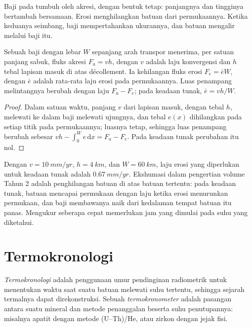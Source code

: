 Baji pada  tumbuh oleh akresi, dengan bentuk tetap: panjangnya
dan tingginya bertambah bersamaan. Erosi menghilangkan batuan dari permukaannya. Ketika
keduanya seimbang, baji mempertahankan ukurannya, dan batuan mengalir melalui baji itu.

\begin{proposition}\label{prop:b3:orogenic-wedges:flux}
Sebuah baji dengan lebar $W$ sepanjang arah transpor menerima, per satuan panjang
sabuk, fluks akresi $F_a = v h$, dengan $v$ adalah
laju konvergensi dan $h$ tebal lapisan masuk di atas décollement. Ia
kehilangan fluks erosi $F_e = \bar e W$, dengan $\bar e$ adalah rata-rata
laju erosi pada permukaannya. Luas penampang melintangnya berubah dengan laju $F_a -
F_e$; pada keadaan tunak, $\bar e = vh/W$.
\end{proposition}

\begin{proof}
Dalam satuan waktu, panjang $v$ dari lapisan masuk, dengan tebal $h$, melewati
ke dalam baji melewati ujungnya, dan tebal $e(x)$ dihilangkan pada setiap
titik pada permukaannya; luasnya tetap, sehingga luas penampang
berubah sebesar $vh - \int_0^W e\,\mathrm dx = F_a - F_e$. Pada keadaan tunak
perubahan itu nol.
\end{proof}

Dengan $v = \qty{10}{mm/yr}$, $h = \qty{4}{km}$, dan $W = \qty{60}{km}$, laju
erosi yang diperlukan untuk keadaan tunak adalah $\qty{0.67}{mm/yr}$. Ekshumasi dalam
pengertian volume Tahun 2 adalah penghilangan batuan di atas batuan tertentu:
pada keadaan tunak, batuan mencapai permukaan dengan laju ketika erosi menurunkan
permukaan, dan baji membawanya naik dari kedalaman tempat batuan itu panas. Mengukur
seberapa cepat memerlukan jam yang dimulai pada suhu yang diketahui.

\section{Termokronologi}\label{sec:b3:orogenic-wedges:thermochronology}

\begin{definition}\label{def:b3:orogenic-wedges:thermochronology}
\emph{Termokronologi} adalah penggunaan umur pendinginan radiometrik
untuk menentukan waktu saat suatu batuan melewati suhu tertentu, sehingga
sejarah termalnya dapat direkonstruksi. Sebuah
\emph{termokronometer} adalah pasangan antara suatu mineral dan
metode penanggalan beserta suhu penutupannya: misalnya apatit
dengan metode (U--Th)/He, atau zirkon dengan jejak fisi.
\end{definition}

